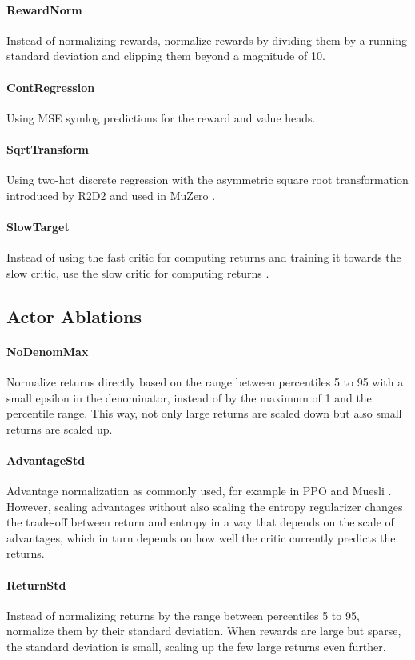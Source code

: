 \paragraph{RewardNorm} Instead of normalizing rewards, normalize rewards by dividing them by a running standard deviation and clipping them beyond a magnitude of 10.
\paragraph{ContRegression} Using MSE symlog predictions for the reward and value heads.
\paragraph{SqrtTransform} Using two-hot discrete regression with the asymmetric square root transformation introduced by R2D2 \citep{kapturowski2018r2d2} and used in MuZero \citep{schrittwieser2019muzero}.
\paragraph{SlowTarget} Instead of using the fast critic for computing returns and training it towards the slow critic, use the slow critic for computing returns \citep{mnih2015dqn}.

\subsection*{Actor Ablations}

\paragraph{NoDenomMax} Normalize returns directly based on the range between percentiles 5 to 95 with a small epsilon in the denominator, instead of by the maximum of 1 and the percentile range. This way, not only large returns are scaled down but also small returns are scaled up.
\paragraph{AdvantageStd} Advantage normalization as commonly used, for example in PPO \citep{schulman2017ppo} and Muesli \citep{hessel2021muesli}. However, scaling advantages without also scaling the entropy regularizer changes the trade-off between return and entropy in a way that depends on the scale of advantages, which in turn depends on how well the critic currently predicts the returns.
\paragraph{ReturnStd} Instead of normalizing returns by the range between percentiles 5 to 95, normalize them by their standard deviation. When rewards are large but sparse, the standard deviation is small, scaling up the few large returns even further.
